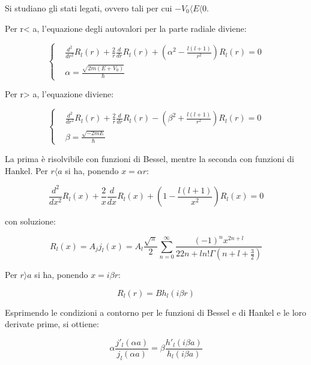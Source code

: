\documentclass{article}
\begin{document}
Si studiano gli stati legati, ovvero tali per cui $-V_0\langle E\langle 0$.

Per r< a, l'equazione degli autovalori per la parte radiale diviene:

\begin{equation}
  \left\{
  \begin{aligned}
     & \frac{d^2}{dr^2}R_l(r)+\frac{2}{r}\frac{d}{dr}R_l(r)+\left(\alpha^2-\frac{l(l+1)}{r^2}\right)R_l(r)=0 \\
     & \alpha=\frac{\sqrt{2m(E+V_0)}}{\hbar}
  \end{aligned}
  \right.
\end{equation}

Per r> a, l'equazione diviene:

\begin{equation}
  \left\{
  \begin{aligned}
     & \frac{d^2}{dr^2}R_l(r)+\frac{2}{r}\frac{d}{dr}R_l(r)-\left(\beta^2+\frac{l(l+1)}{r^2}\right)R_l(r)=0 \\
     & \beta=\frac{\sqrt{-2mE}}{\hbar}
  \end{aligned}
  \right.
\end{equation}


La prima è risolvibile con funzioni di Bessel, mentre la seconda con funzioni di Hankel.
Per $r\langle a$ si ha, ponendo $x=\alpha r$:

\begin{equation}
  \frac{d^2}{dx^2}R_l(x)+\frac{2}{x}\frac{d}{dx}R_l(x)+\left(1-\frac{l(l+1)}{x^2}\right)R_l(x)=0
\end{equation}

con soluzione:

\begin{equation}
  R_l(x)=A_j j_l(x)=A_l \frac{\sqrt{\pi}}{2}\sum_{n=0}^{\infty}\frac{(-1)^nx^{2n+l}}{2{2n+l}n!\Gamma(n+l+\frac{3}{2})}
\end{equation}

Per $r\rangle a$ si ha, ponendo $x=i\beta r$:

\begin{equation}
  R_l(r)=Bh_l(i\beta r)
\end{equation}

Esprimendo le condizioni a contorno per le funzioni di Bessel e di Hankel e le loro derivate prime, si ottiene:

\begin{equation}
  \alpha \frac{j'_l(\alpha a)}{j_l(\alpha a)}=\beta \frac{h'_l(i\beta a)}{h_l(i\beta a)}
\end{equation}
\end{document}
